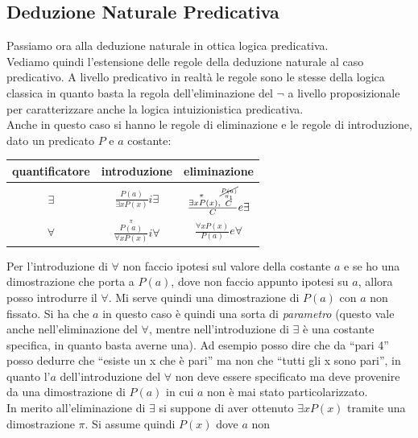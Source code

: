 \documentclass[a4paper,12pt, oneside]{book}
\begin{document}
\subsection{Deduzione Naturale Predicativa}
Passiamo ora alla deduzione naturale in ottica logica predicativa.\\
Vediamo quindi l'estensione delle regole della deduzione naturale al caso
predicativo. A livello predicativo in realtà le regole sono le stesse della
logica classica in quanto basta la regola dell'eliminazione del $\neg$ a livello
proposizionale per caratterizzare anche la logica intuizionistica predicativa.\\
Anche in questo caso si hanno le regole di eliminazione e le regole di
introduzione, dato un predicato $P$ e $a$ costante:
\begin{table}[H]
  \Large
  \centering
  \begin{tabular}{c|c|c}
    quantificatore & introduzione & eliminazione\\
    \hline
    $\exists$ & $\frac{P(a)}{\exists xP(x)}i\exists$
                                  &$\frac{\stackrel{\pi}{\exists xP(x}),
                                    \stackrel{
                                    \stackrel{\cancel{P(a)}}{\pi_1}}{C}}{C}
                                    e\exists$\\
    \hline
    $\forall$ & $\frac{\stackrel{\pi}{P(a)}}{\forall xP(x)}i\forall$
                                  &$\frac{\forall xP(x)}{P(a)}e\forall$\\
  \end{tabular}
\end{table}
Per l'introduzione di $\forall$ non faccio ipotesi sul valore della costante $a$
e se ho una dimostrazione che porta a $P(a)$, dove non faccio appunto ipotesi su
$a$, allora posso introdurre il $\forall$. Mi serve quindi una dimostrazione di
$P(a)$ con $a$ non fissato. Si ha che $a$ in questo caso è quindi una sorta di
\textit{parametro} (questo vale anche nell'eliminazione del $\forall$, mentre
nell'introduzione di $\exists$ è una costante specifica, in quanto basta averne
una). Ad esempio posso dire che da ``pari 4'' posso dedurre che ``esiste un x
che è pari'' ma non che ``tutti gli x sono pari'', in quanto l'$a$
dell'introduzione del $\forall$ non deve essere specificato ma deve provenire da
una dimostrazione di $P(a)$ in cui $a $ non è mai stato particolarizzato.\\  
In merito all'eliminazione di $\exists$ si suppone di aver ottenuto $\exists
xP(x)$ tramite una dimostrazione $\pi$. Si assume quindi $P(x)$ dove $a$ non
\end{document}
